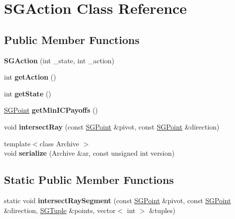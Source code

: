\hypertarget{class_s_g_action}{\section{S\+G\+Action Class Reference}
\label{class_s_g_action}
}
\subsection*{Public Member Functions}
\begin{DoxyCompactItemize}
\item 
\hypertarget{class_s_g_action_a5c4e2fed7e293c07b7408b897f077b67}{{\bfseries S\+G\+Action} (int \+\_\+state, int \+\_\+action)}\label{class_s_g_action_a5c4e2fed7e293c07b7408b897f077b67}

\item 
\hypertarget{class_s_g_action_a3ceb854f93eb555ec5caea61cafb5ea3}{int {\bfseries get\+Action} ()}\label{class_s_g_action_a3ceb854f93eb555ec5caea61cafb5ea3}

\item 
\hypertarget{class_s_g_action_a740ace754e84e2fb6db0dad821780d84}{int {\bfseries get\+State} ()}\label{class_s_g_action_a740ace754e84e2fb6db0dad821780d84}

\item 
\hypertarget{class_s_g_action_ae009adab61cb795f47ba7b820f46f988}{\hyperlink{class_s_g_point}{S\+G\+Point} {\bfseries get\+Min\+I\+C\+Payoffs} ()}\label{class_s_g_action_ae009adab61cb795f47ba7b820f46f988}

\item 
\hypertarget{class_s_g_action_a7ecafdb0cf42f83931f923f2e4e23f25}{void {\bfseries intersect\+Ray} (const \hyperlink{class_s_g_point}{S\+G\+Point} \&pivot, const \hyperlink{class_s_g_point}{S\+G\+Point} \&direction)}\label{class_s_g_action_a7ecafdb0cf42f83931f923f2e4e23f25}

\item 
\hypertarget{class_s_g_action_a2d1b9515be55e396e8595051ba6d3bdd}{{\footnotesize template$<$class Archive $>$ }\\void {\bfseries serialize} (Archive \&ar, const unsigned int version)}\label{class_s_g_action_a2d1b9515be55e396e8595051ba6d3bdd}

\end{DoxyCompactItemize}
\subsection*{Static Public Member Functions}
\begin{DoxyCompactItemize}
\item 
\hypertarget{class_s_g_action_aba325273d8fd3c9de667e338482858df}{static void {\bfseries intersect\+Ray\+Segment} (const \hyperlink{class_s_g_point}{S\+G\+Point} \&pivot, const \hyperlink{class_s_g_point}{S\+G\+Point} \&direction, \hyperlink{class_s_g_tuple}{S\+G\+Tuple} \&points, vector$<$ int $>$ \&tuples)}\label{class_s_g_action_aba325273d8fd3c9de667e338482858df}

\end{DoxyCompactItemize}
